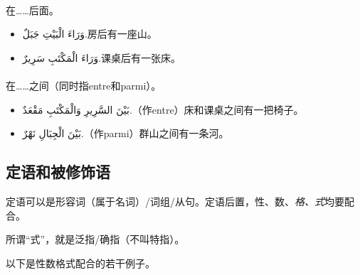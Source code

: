 \paragraph{} 在……后面。
\begin{itemize}
    \item \ac{وَرَاءَ الْبَيْتِ جَبَلٌ.}{房后有一座山。}
    \item \ac{وَرَاءَ الْمَكْتَبِ سَرِيرٌ.}{课桌后有一张床。}
\end{itemize}   

\paragraph{} 在……之间（同时指entre和parmi）。
\begin{itemize}
    \item \ac{بَيْنَ السَّرِيرِ وَالْمَكْتَبِ مَقْعَدٌ.}{（作entre）床和课桌之间有一把椅子。}
    \item \ac{بَيْنَ الْجِبَالِ نَهْرٌ.}{（作parmi）群山之间有一条河。}
\end{itemize}

\begin{note}
    \begin{center}
        
    \end{center}
\end{note}

\subsection{ 定语和被修饰语}

定语可以是形容词（属于名词）/词组/从句。定语后置，性、数、\emph{格、式}均要配合。

\begin{note}
    所谓``式''，就是泛指/确指（不叫特指）。
\end{note}

以下是性数格式配合的若干例子。

